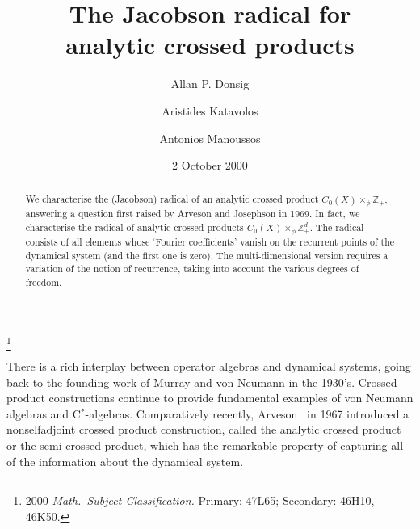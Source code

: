 \documentclass[12pt]{amsart}
\theoremstyle{definition}
\newcommand{\bbZ}{\mathbb{Z}}
\newcommand{\cstar}{C$^*$}
\begin{document}
\title[The Jacobson radical for analytic crossed products]{The
    Jacobson radical for \\ analytic crossed products}
\author[Donsig]{Allan P. Donsig}
\address{Mathematics \& Statistics Dept.\\
     University of Nebraska---Lincoln\\
     Lincoln, NE,  68588, U.S.A.}
\author[Katavolos]{Aristides Katavolos}
\address{Dept.\ of Mathematics\\
    University of Athens\\
    Panepistimioupolis\\
    GR-157 84, Athens\\
    GREECE}
\author[Manoussos]{Antonios Manoussos}
\address{123, Sapfous St.\\
        176 75 Kallithea\\
        Athens\\
    GREECE}
\date{2 October 2000}
\thanks{2000 {\it Math.\ Subject Classification.} Primary: 47L65;
    Secondary: 46H10, 46K50.}

\begin{abstract}
We characterise the (Jacobson) radical of an analytic crossed
product $C_0(X) \times_\phi \bbZ_+$, answering a question first
raised by Arveson and Josephson in 1969. In fact, we characterise
the radical of analytic crossed products $C_0(X) \times_\phi
\bbZ^d_+$.
The radical consists of all elements whose `Fourier coefficients'
vanish on the recurrent points of the dynamical system (and the
first one is zero). The multi-dimensional version requires a
variation of the notion of recurrence, taking into account the
various degrees of freedom.
\end{abstract}

\maketitle

There is a rich interplay between operator algebras and dynamical
systems, going back to the founding work of Murray and von Neumann
in the 1930's.
Crossed product constructions continue to provide fundamental
examples of von Neumann algebras and \cstar-algebras.
Comparatively recently, Arveson~\cite{Arv67a} in 1967 introduced a
nonselfadjoint crossed product construction,
called the analytic crossed product or the semi-crossed product,
which has the remarkable property of capturing all of the information
about the dynamical system.
\end{document}
